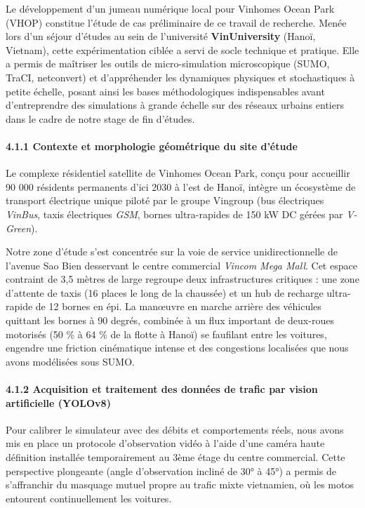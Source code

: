 \documentclass[10pt, a4paper]{article}
\begin{document}
Le développement d'un jumeau numérique local pour Vinhomes Ocean Park
(VHOP) constitue l'étude de cas préliminaire de ce travail de recherche.
Menée lors d'un séjour d'études au sein de l'université
\textbf{VinUniversity} (Hanoï, Vietnam), cette expérimentation ciblée a
servi de socle technique et pratique. Elle a permis de maîtriser les
outils de micro-simulation microscopique (SUMO, TraCI, netconvert) et
d'appréhender les dynamiques physiques et stochastiques à petite
échelle, posant ainsi les bases méthodologiques indispensables avant
d'entreprendre des simulations à grande échelle sur des réseaux urbains
entiers dans le cadre de notre stage de fin d'études.

\paragraph{4.1.1 Contexte et morphologie géométrique du site
d'étude}\label{contexte-et-morphologie-guxe9omuxe9trique-du-site-duxe9tude}

Le complexe résidentiel satellite de Vinhomes Ocean Park, conçu pour
accueillir 90 000 résidents permanents d'ici 2030 à l'est de Hanoï,
intègre un écosystème de transport électrique unique piloté par le
groupe Vingroup (bus électriques \emph{VinBus}, taxis électriques
\emph{GSM}, bornes ultra-rapides de 150 kW DC gérées par
\emph{V-Green}).

Notre zone d'étude s'est concentrée sur la voie de service
unidirectionnelle de l'avenue Sao Bien desservant le centre commercial
\emph{Vincom Mega Mall}. Cet espace contraint de 3,5 mètres de large
regroupe deux infrastructures critiques : une zone d'attente de taxis
(16 places le long de la chaussée) et un hub de recharge ultra-rapide de
12 bornes en épi. La manœuvre en marche arrière des véhicules quittant
les bornes à 90 degrés, combinée à un flux important de deux-roues
motorisés (50 \% à 64 \% de la flotte à Hanoï) se faufilant entre les
voitures, engendre une friction cinématique intense et des congestions
localisées que nous avons modélisées sous SUMO.

\paragraph{4.1.2 Acquisition et traitement des données de trafic par
vision artificielle
(YOLOv8)}\label{acquisition-et-traitement-des-donnuxe9es-de-trafic-par-vision-artificielle-yolov8}

Pour calibrer le simulateur avec des débits et comportements réels, nous
avons mis en place un protocole d'observation vidéo à l'aide d'une
caméra haute définition installée temporairement au 3ème étage du centre
commercial. Cette perspective plongeante (angle d'observation incliné de
30° à 45°) a permis de s'affranchir du masquage mutuel propre au trafic
mixte vietnamien, où les motos entourent continuellement les voitures.
\end{document}
